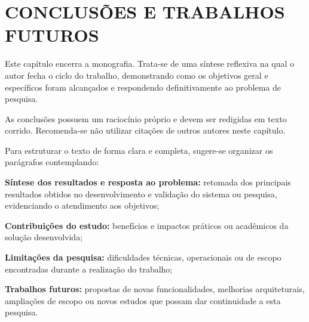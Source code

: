 \chapter{CONCLUSÕES E TRABALHOS FUTUROS}
Este capítulo encerra a monografia. Trata-se de uma síntese reflexiva na qual o autor fecha o ciclo do trabalho, demonstrando como os objetivos geral e específicos foram alcançados e respondendo definitivamente ao problema de pesquisa.

As conclusões possuem um raciocínio próprio e devem ser redigidas em texto corrido. Recomenda-se não utilizar citações de outros autores neste capítulo.

Para estruturar o texto de forma clara e completa, sugere-se organizar os parágrafos contemplando:
\begin{uemaball}
    \item \textbf{Síntese dos resultados e resposta ao problema:} retomada dos principais resultados obtidos no desenvolvimento e validação do sistema ou pesquisa, evidenciando o atendimento aos objetivos;
    \item \textbf{Contribuições do estudo:} benefícios e impactos práticos ou acadêmicos da solução desenvolvida;
    \item \textbf{Limitações da pesquisa:} dificuldades técnicas, operacionais ou de escopo encontradas durante a realização do trabalho;
    \item \textbf{Trabalhos futuros:} propostas de novas funcionalidades, melhorias arquiteturais, ampliações de escopo ou novos estudos que possam dar continuidade a esta pesquisa.
\end{uemaball}
